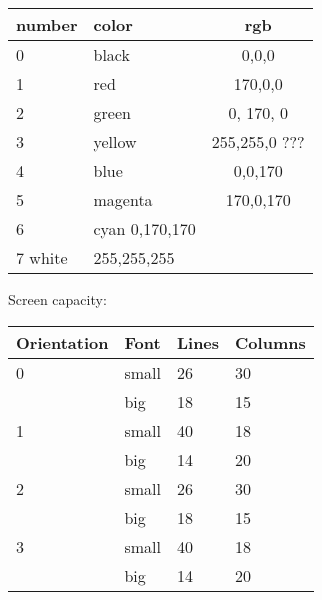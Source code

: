 \begin{tabular}{|l|l|c|}
\hline
number & color  & rgb \\
\hline
0 & black  & 0,0,0\\
1 & red  & 170,0,0\\
2 & green & 0, 170, 0 \\
3 & yellow & 255,255,0 ???\\
4 & blue & 0,0,170\\
5 & magenta & 170,0,170\\
6 & cyan  0,170,170\\
7 white & 255,255,255\\
\hline
\end{tabular}

Screen capacity:

\begin{tabular}{|l|l|l|l|}
\hline
Orientation & Font & Lines & Columns \\
\hline
 0 & small & 26 & 30  \\
   & big   & 18 & 15 \\
\hline
1 & small & 40 & 18 \\
  & big &   14 & 20 \\
\hline
 2 & small & 26 & 30  \\
   & big   & 18 & 15 \\
\hline
3 & small & 40 & 18 \\
  & big &   14 & 20 \\
\hline
\end{tabular}


